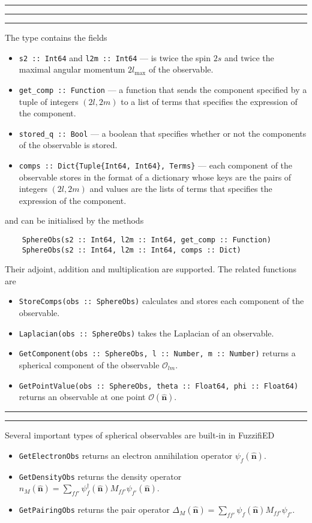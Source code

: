 \documentclass{timesjhep}
\newenvironment{block}[1]{\vspace{0.4\baselineskip}\hrule\vspace{0.10\baselineskip}\hrule\vspace{0.30\baselineskip}{\bfseries #1}\vspace{0.2\baselineskip}\hrule\vspace{0.3\baselineskip}
}{\vspace{0.2\baselineskip}\hrule\vspace{0.10\baselineskip}\hrule\vspace{0.5\baselineskip}}
\begin{document}
\begin{block}{\lstinline|SphereObs| --- Type}
The type contains the fields
\begin{itemize}
    \item \lstinline|s2 :: Int64| and  \lstinline|l2m :: Int64| --- is twice the spin $2s$ and twice the maximal angular momentum $2l_{\max}$ of the observable.
    \item \lstinline|get_comp :: Function| --- a function that sends the component specified by a tuple of integers $(2l,2m)$ to a list of terms that specifies the expression of the component. 
    \item \lstinline|stored_q :: Bool| --- a boolean that specifies whether or not the components of the observable is stored.
    \item \lstinline|comps :: Dict{Tuple{Int64, Int64}, Terms}| --- each component of the observable stores in the format of a dictionary whose keys are the pairs of integers $(2l,2m)$ and values are the lists of terms that specifies the expression of the component. 
\end{itemize}
and can be initialised by the methods 
\begin{lstlisting}
    SphereObs(s2 :: Int64, l2m :: Int64, get_comp :: Function)
    SphereObs(s2 :: Int64, l2m :: Int64, comps :: Dict)
\end{lstlisting}
Their adjoint, addition and multiplication are supported. The related functions are 
\begin{itemize}
    \item \lstinline|StoreComps(obs :: SphereObs)| calculates and stores each component of the observable.
    \item \lstinline|Laplacian(obs :: SphereObs)| takes the Laplacian of an observable.
    \item \lstinline|GetComponent(obs :: SphereObs, l :: Number, m :: Number)| returns a spherical component of the observable $\mathcal{O}_{lm}$.
    \item \lstinline|GetPointValue(obs :: SphereObs, theta :: Float64, phi :: Float64)| returns an observable at one point $\mathcal{O}(\hat{\mathbf{n}})$.
\end{itemize}
\end{block}

Several important types of spherical observables are built-in in FuzzifiED 
\begin{itemize}
    \item \lstinline|GetElectronObs| returns an electron annihilation operator $\psi_f(\hat{\mathbf{n}})$.
    \item \lstinline|GetDensityObs| returns the density operator $n_M(\hat{\mathbf{n}})=\sum_{ff'}\psi^\dagger_{f}(\hat{\mathbf{n}})M_{ff'}\psi_{f'}(\hat{\mathbf{n}})$.
    \item \lstinline|GetPairingObs| returns the pair operator $\Delta_M(\hat{\mathbf{n}})=\sum_{ff'}\psi_{f}(\hat{\mathbf{n}})M_{ff'}\psi_{f'}$. 
\end{itemize} 
\end{document}
